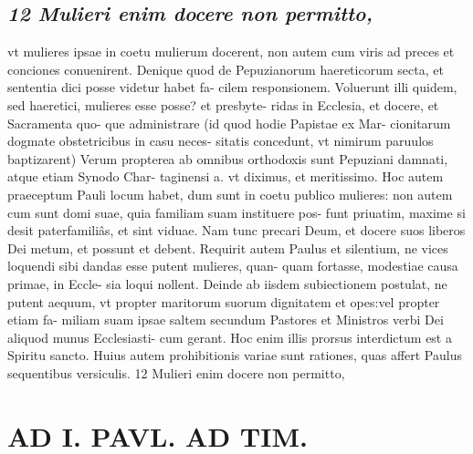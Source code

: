 \documentclass{article}
\begin{document}
\begin{pages}
\subsection*{\textit{12 Mulieri enim docere non permitto,}}vt mulieres ipsae in coetu mulierum docerent, non autem cum viris ad preces et conciones conuenirent. Denique quod de Pepuzianorum haereticorum secta, et sententia dici posse videtur habet fa- cilem responsionem. Voluerunt illi quidem, sed haeretici, mulieres esse posse? et presbyte- ridas in Ecclesia, et docere, et Sacramenta quo- que administrare (id quod hodie Papistae ex Mar- cionitarum dogmate obstetricibus in casu neces- sitatis concedunt, vt nimirum paruulos baptizarent) Verum propterea ab omnibus orthodoxis sunt Pepuziani damnati, atque etiam Synodo Char- taginensi a. vt diximus, et meritissimo. Hoc autem praeceptum Pauli locum habet, dum sunt in coetu publico mulieres: non autem cum sunt domi suae, quia familiam suam instituere pos- funt priuatim, maxime si desit paterfamiliâs, et sint viduae. Nam tunc precari Deum, et docere suos liberos Dei metum, et possunt et debent. Requirit autem Paulus et silentium, ne vices loquendi sibi dandas esse putent mulieres, quan- quam fortasse, modestiae causa primae, in Eccle- sia loqui nollent. Deinde ab iisdem subiectionem postulat, ne putent aequum, vt propter maritorum suorum dignitatem et opes:vel propter etiam fa- miliam suam ipsae saltem secundum Pastores et Ministros verbi Dei aliquod munus Ecclesiasti- cum gerant. Hoc enim illis prorsus interdictum est a Spiritu sancto. Huius autem prohibitionis variae sunt rationes, quas affert Paulus sequentibus  versiculis. 12 Mulieri enim docere non permitto,  \pend
\section*{AD I. PAVL. AD TIM. }
\marginpar{[ p.84 ]}\pstart {}
{}

\end{pages}
\end{document}
